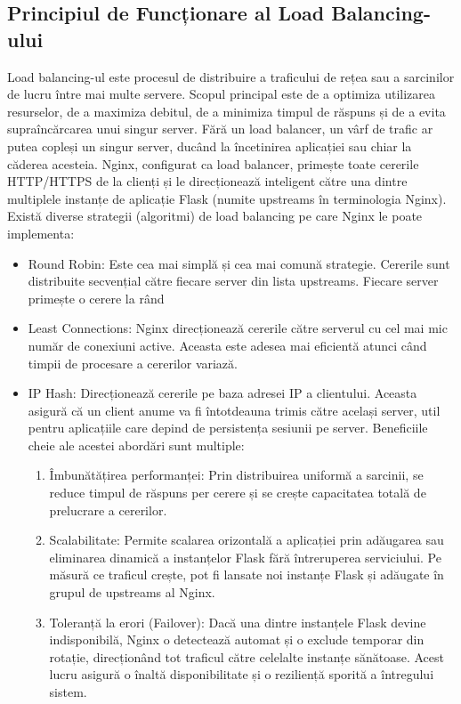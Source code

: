 \documentclass[12pt, a4paper, oneside, romanian]{teza-upb}
\begin{document}
\subsection{Principiul de Funcționare al Load Balancing-ului}
Load balancing-ul este procesul de distribuire a traficului de rețea sau a sarcinilor de lucru între mai multe servere. Scopul principal este de a optimiza utilizarea resurselor, de a maximiza debitul, de a minimiza timpul de răspuns și de a evita supraîncărcarea unui singur server. Fără un load balancer, un vârf de trafic ar putea copleși un singur server, ducând la încetinirea aplicației sau chiar la căderea acesteia. Nginx, configurat ca load balancer, primește toate cererile HTTP/HTTPS de la clienți și le direcționează inteligent către una dintre multiplele instanțe de aplicație Flask (numite upstreams în terminologia Nginx). Există diverse strategii (algoritmi) de load balancing pe care Nginx le poate implementa:
\begin{itemize}
	\item Round Robin: Este cea mai simplă și cea mai comună strategie. Cererile sunt distribuite secvențial către fiecare server din lista upstreams. Fiecare server primește o cerere la rând
	\item Least Connections: Nginx direcționează cererile către serverul cu cel mai mic număr de conexiuni active. Aceasta este adesea mai eficientă atunci când timpii de procesare a cererilor variază.
	\item IP Hash: Direcționează cererile pe baza adresei IP a clientului. Aceasta asigură că un client anume va fi întotdeauna trimis către același server, util pentru aplicațiile care depind de persistența sesiunii pe server. Beneficiile cheie ale acestei abordări sunt multiple:
	\begin{enumerate}
		\item Îmbunătățirea performanței: Prin distribuirea uniformă a sarcinii, se reduce timpul de răspuns per cerere și se crește capacitatea totală de prelucrare a cererilor.
		\item Scalabilitate: Permite scalarea orizontală a aplicației prin adăugarea sau eliminarea dinamică a instanțelor Flask fără întreruperea serviciului. Pe măsură ce traficul crește, pot fi lansate noi instanțe Flask și adăugate în grupul de upstreams al Nginx.
		\item Toleranță la erori (Failover): Dacă una dintre instanțele Flask devine indisponibilă, Nginx o detectează automat și o exclude temporar din rotație, direcționând tot traficul către celelalte instanțe sănătoase. Acest lucru asigură o înaltă disponibilitate și o reziliență sporită a întregului sistem.
	\end{enumerate}	
\end{itemize}
\end{document}
